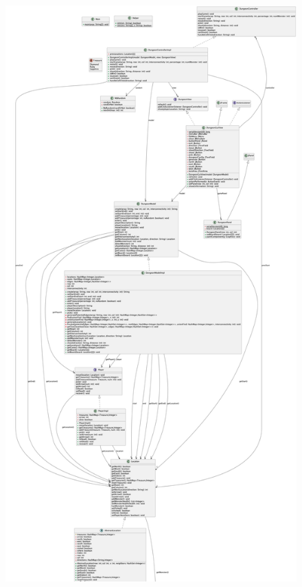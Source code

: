 \documentclass[12pt]{amsart}
\title{}
\author{}
\date{} %
\begin{document}
\begin{figure}[H] %
\centering %
\includegraphics[width=1\textwidth]{uml.png} %
\end{figure}
\end{document}
